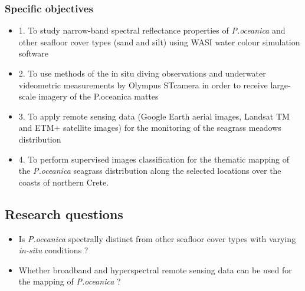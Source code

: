 \documentclass[11pt]{article}
\begin{document}
\subsubsection{Specific objectives}
	\begin{itemize}	
		\item[]1.	To study narrow-band spectral reflectance properties of \textit{P.oceanica} and other seafloor cover types (sand and silt) using WASI water colour simulation software 
		\item[]2.	To use methods of the in situ diving observations and underwater videometric measurements by \ac{Olympus ST}camera in order to receive large-scale imagery of the P.oceanica mattes 
		\item[]3.	To apply remote sensing data (Google Earth aerial images, \ac{Landsat TM} and ETM+ satellite images) for the monitoring of the seagrass meadows distribution 
		\item[]4.	To perform supervised images classification for the thematic mapping of the \textit{P.oceanica} seagrass distribution along the selected locations over the coasts of northern Crete. 
	\end{itemize}


\subsection{Research questions}
	\begin{itemize}	
		\item Is \textit{P.oceanica} spectrally distinct from other seafloor cover types with varying \textit{in-situ} conditions ?
		\item Whether broadband and hyperspectral remote sensing data can be used for the mapping of \textit{P.oceanica} ?
	\end{itemize}
\end{document}
